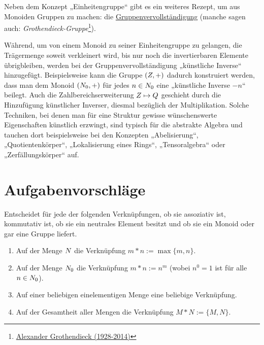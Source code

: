 \begin{vorschau}[* Gruppenvervollständigung] \label{gruppenvervollstaendigung}
    Neben dem Konzept „Einheitengruppe“ gibt es ein weiteres Rezept, um aus Monoiden Gruppen zu machen: die \href{https://de.wikipedia.org/wiki/Grothendieck-Gruppe}{Gruppenvervollständigung} (manche sagen auch: \emph{Grothendieck-Gruppe}\footnote{\href{https://de.wikipedia.org/wiki/Alexander_Grothendieck}{Alexander Grothendieck (1928-2014)}}).
    
    Während, um von einem Monoid zu seiner Einheitengruppe zu gelangen, die Trägermenge soweit verkleinert wird, bis nur noch die invertierbaren Elemente übrigbleiben, werden bei der Gruppenvervollständigung „künstliche Inverse“ hinzugefügt. Beispielsweise kann die Gruppe $(\relax Z,+)$ dadurch konstruiert werden, dass man dem Monoid $(\relax N_0,+)$ für jedes $n\in \relax N_0$ eine „künstliche Inverse $-n$“ beilegt. Auch die Zahlbereichserweiterung $\relax Z \mapsto \relax Q$ geschieht durch die Hinzufügung künstlicher Inverser, diesmal bezüglich der Multiplikation. Solche Techniken, bei denen man für eine Struktur gewisse wünschenswerte Eigenschaften künstlich erzwingt, sind typisch für die abstrakte Algebra und tauchen dort beispielsweise bei den Konzepten „Abelisierung“, „Quotientenkörper“, „Lokalisierung eines Rings“, „Tensoralgebra“ oder „Zerfällungskörper“ auf.
\end{vorschau}





\clearpage
\section{Aufgabenvorschläge}


\begin{aufg} \label{aufg:verknuepfungen}
    Entscheidet für jede der folgenden Verknüpfungen, ob sie assoziativ ist, kommutativ ist, ob sie ein neutrales Element besitzt und ob sie ein Monoid oder gar eine Gruppe liefert.
    \begin{enumerate}
        \item Auf der Menge $\relax N$ die Verknüpfung $m*n:=\max \{m,n\}$.
        \item Auf der Menge $\relax N_0$ die Verknüpfung $m*n:=n^m$ (wobei $n^0=1$ ist für alle $n\in \relax N_0$).
        \item Auf einer beliebigen einelementigen Menge eine beliebige Verknüpfung.
        \item Auf der Gesamtheit aller Mengen die Verknüpfung $M*N:=\{M,N\}$.
    \end{enumerate}
\end{aufg}


